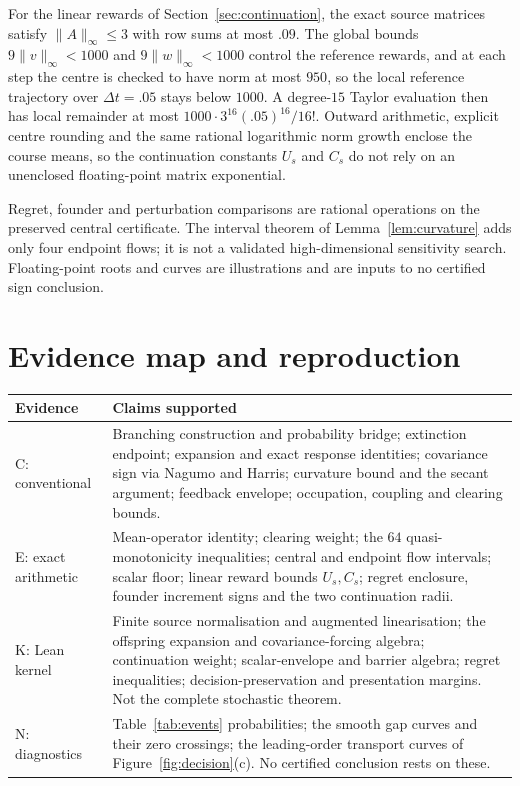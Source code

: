 \documentclass[11pt]{article}
\theoremstyle{remark}
\begin{document}
For the linear rewards of Section~\ref{sec:continuation}, the exact source
matrices satisfy $\|A\|_\infty\le3$ with row sums at most $.09$. The global bounds
$9\|v\|_\infty<1000$ and $9\|w\|_\infty<1000$ control the reference rewards, and
at each step the centre is checked to have norm at most $950$, so the local
reference trajectory over $\Delta t=.05$ stays below $1000$. A degree-$15$ Taylor
evaluation then has local remainder at most $1000\cdot3^{16}(.05)^{16}/16!$.
Outward arithmetic, explicit centre rounding and the same rational logarithmic
norm growth enclose the course means, so the continuation constants $U_s$ and
$C_s$ do not rely on an unenclosed floating-point matrix exponential.

Regret, founder and perturbation comparisons are rational operations on the
preserved central certificate. The interval theorem of
Lemma~\ref{lem:curvature} adds only four endpoint flows; it is not a validated
high-dimensional sensitivity search. Floating-point roots and curves are
illustrations and are inputs to no certified sign conclusion.

\section{Evidence map and reproduction}\label{sec:evidencemap}

\begin{center}\small
\begin{tabular}{lp{.72\linewidth}}\toprule
Evidence&Claims supported\\\midrule
C: conventional&Branching construction and probability bridge; extinction
endpoint; expansion and exact response identities; covariance sign via Nagumo and
Harris; curvature bound and the secant argument; feedback envelope; occupation,
coupling and clearing bounds.\\
E: exact arithmetic&Mean-operator identity; clearing weight; the $64$
quasi-monotonicity inequalities; central and endpoint flow intervals; scalar
floor; linear reward bounds $U_s,C_s$; regret enclosure, founder increment signs
and the two continuation radii.\\
K: Lean kernel&Finite source normalisation and augmented linearisation; the
offspring expansion and covariance-forcing algebra; continuation weight;
scalar-envelope and barrier algebra; regret inequalities; decision-preservation
and presentation margins. Not the complete stochastic theorem.\\
N: diagnostics&Table~\ref{tab:events} probabilities; the smooth gap curves and
their zero crossings; the leading-order transport curves of
Figure~\ref{fig:decision}(c). No certified conclusion rests on these.\\
\bottomrule
\end{tabular}
\end{center}
\end{document}
